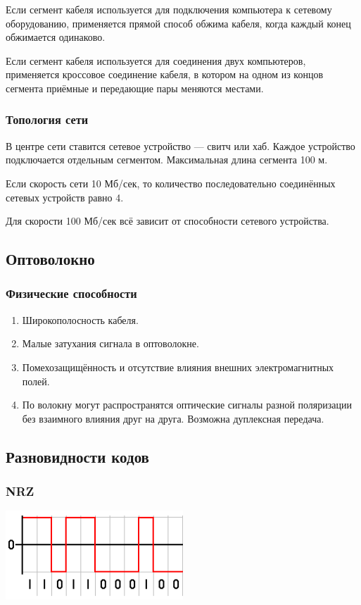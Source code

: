 \documentclass[12pt, russian, oneside, article]{ncc}
\begin{document}
Если сегмент кабеля используется для подключения компьютера к сетевому оборудованию, применяется прямой способ обжима кабеля, когда каждый конец обжимается одинаково.

Если сегмент кабеля используется для соединения двух компьютеров, применяется кроссовое соединение кабеля, в котором на одном из концов сегмента приёмные и передающие пары меняются местами.
\subsubsection{Топология сети}
\label{sec-4_5_3}


В центре сети ставится сетевое устройство --- свитч или хаб. Каждое устройство подключается отдельным сегментом. Максимальная длина сегмента 100 м.

Если скорость сети 10 Мб/сек, то количество последовательно соединённых сетевых устройств равно 4.

Для скорости 100 Мб/сек всё зависит от способности сетевого устройства.
\subsection{Оптоволокно}
\label{sec-4_6}
\subsubsection{Физические способности}
\label{sec-4_6_1}


\begin{enumerate}
\item Широкополосность кабеля.
\item Малые затухания сигнала в оптоволокне.
\item Помехозащищённость и отсутствие влияния внешних электромагнитных полей.
\item По волокну могут распространятся оптические сигналы разной поляризации без взаимного влияния друг на друга. Возможна дуплексная передача.
\end{enumerate}
\subsection{Разновидности кодов}
\label{sec-4_7}
\subsubsection{NRZ}
\label{sec-4_7_1}


\includegraphics[width=0.5\textwidth]{images/SiSPI/NRZcode.png}
\end{document}
